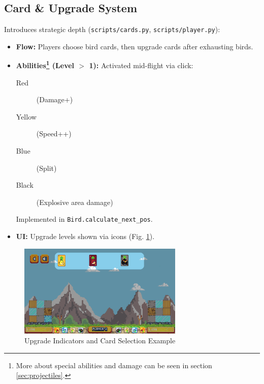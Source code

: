 \documentclass[11pt, a4paper]{article}
\begin{document}
\vspace{1cm}

\subsection{Card \& Upgrade System}
\label{sec:upgrades}

Introduces strategic depth (\texttt{scripts/cards.py}, \texttt{scripts/player.py}):

\begin{itemize}

    \item \textbf{Flow:} Players choose bird cards, then upgrade cards after exhausting birds.
    
    \item \textbf{Abilities\footnote{More about special abilities and damage can be seen in section \ref{sec:projectiles}.} (Level $>$ 1):} Activated mid-flight via click: 
    
    \begin{description}
    
        \item[Red] (Damage+)
        
        \item[Yellow] (Speed++)
        
        \item[Blue] (Split)
        
        \item[Black] (Explosive area damage)
    
    \end{description}
    
    Implemented in \texttt{Bird.calculate\_next\_pos}.
    
    \item \textbf{UI:} Upgrade levels shown via icons (Fig. \ref{fig:upgrades_a}).

\end{itemize}


\begin{figure}[h!]

    \centering
    
    \includegraphics[width=0.7\textwidth]{images/upgrade.png}
    
    \caption{Upgrade Indicators and Card Selection Example}
    
    \label{fig:upgrades_a}

\end{figure}
\end{document}
